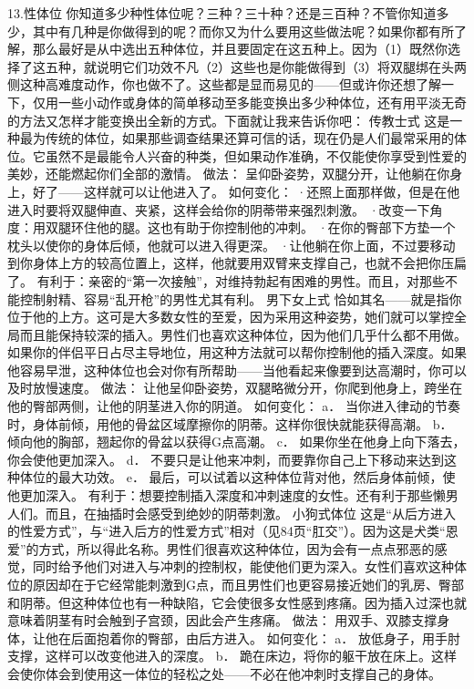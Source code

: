 \documentclass[12pt,UTF8,openany]{ctexbook}
\begin{document}
13.性体位
你知道多少种性体位呢？三种？三十种？还是三百种？不管你知道多少，其中有几种是你做得到的呢？而你又为什么要用这些做法呢？如果你都有所了解，那么最好是从中选出五种体位，并且要固定在这五种上。因为（1）既然你选择了这五种，就说明它们功效不凡（2）这些也是你能做得到（3）将双腿绑在头两侧这种高难度动作，你也做不了。这些都是显而易见的——但或许你还想了解一下，仅用一些小动作或身体的简单移动至多能变换出多少种体位，还有用平淡无奇的方法又怎样才能变换出全新的方式。下面就让我来告诉你吧：
传教士式
这是一种最为传统的体位，如果那些调查结果还算可信的话，现在仍是人们最常采用的体位。它虽然不是最能令人兴奋的种类，但如果动作准确，不仅能使你享受到性爱的美妙，还能燃起你们全部的激情。
做法：
呈仰卧姿势，双腿分开，让他躺在你身上，好了——这样就可以让他进入了。
如何变化：
·还照上面那样做，但是在他进入时要将双腿伸直、夹紧，这样会给你的阴蒂带来强烈刺激。
·改变一下角度：用双腿环住他的腿。这也有助于你控制他的冲刺。
·在你的臀部下方垫一个枕头以使你的身体后倾，他就可以进入得更深。
·让他躺在你上面，不过要移动到你身体上方的较高位置上，这样，他就要用双臂来支撑自己，也就不会把你压扁了。
有利于：亲密的“第一次接触”，对维持勃起有困难的男性。而且，对那些不能控制射精、容易“乱开枪”的男性尤其有利。
男下女上式
恰如其名——就是指你位于他的上方。这可是大多数女性的至爱，因为采用这种姿势，她们就可以掌控全局而且能保持较深的插入。男性们也喜欢这种体位，因为他们几乎什么都不用做。如果你的伴侣平日占尽主导地位，用这种方法就可以帮你控制他的插入深度。如果他容易早泄，这种体位也会对你有所帮助——当他看起来像要到达高潮时，你可以及时放慢速度。
做法：
让他呈仰卧姿势，双腿略微分开，你爬到他身上，跨坐在他的臀部两侧，让他的阴茎进入你的阴道。
如何变化：
a． 当你进入律动的节奏时，身体前倾，用他的骨盆区域摩擦你的阴蒂。这样你很快就能获得高潮。
b． 倾向他的胸部，翘起你的骨盆以获得G点高潮。
c． 如果你坐在他身上向下落去，你会使他更加深入。
d． 不要只是让他来冲刺，而要靠你自己上下移动来达到这种体位的最大功效。
e． 最后，可以试着以这种体位背对他，然后身体前倾，使他更加深入。
有利于：想要控制插入深度和冲刺速度的女性。还有利于那些懒男人们。而且，在抽插时会感受到绝妙的阴蒂刺激。
小狗式体位
这是“从后方进入的性爱方式”，与“进入后方的性爱方式”相对（见84页“肛交”）。因为这是犬类“恩爱”的方式，所以得此名称。男性们很喜欢这种体位，因为会有一点点邪恶的感觉，同时给予他们对进入与冲刺的控制权，能使他们更为深入。女性们喜欢这种体位的原因却在于它经常能刺激到G点，而且男性们也更容易接近她们的乳房、臀部和阴蒂。但这种体位也有一种缺陷，它会使很多女性感到疼痛。因为插入过深也就意味着阴茎有时会触到子宫颈，因此会产生疼痛。
做法：
用双手、双膝支撑身体，让他在后面抱着你的臀部，由后方进入。
如何变化：
a． 放低身子，用手肘支撑，这样可以改变他进入的深度。
b． 跪在床边，将你的躯干放在床上。这样会使你体会到使用这一体位的轻松之处——不必在他冲刺时支撑自己的身体。
\end{document}
